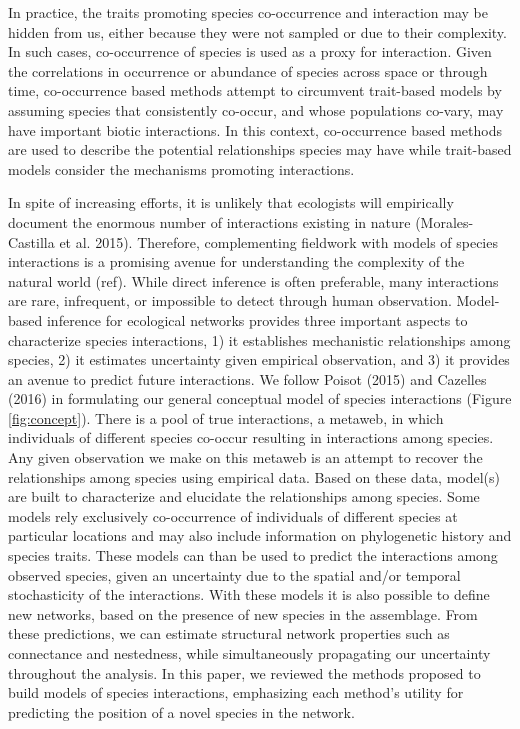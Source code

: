 In practice, the traits promoting species co-occurrence and interaction may be
hidden from us, either because they were not sampled or due to their complexity.
In such cases, co-occurrence of species is used as a proxy for interaction.
Given the correlations in occurrence or abundance of species across space or
through time, co-occurrence based methods attempt to circumvent trait-based
models by assuming species that consistently co-occur, and whose populations
co-vary, may have important biotic interactions. In this context, co-occurrence
based methods are used to describe the potential relationships species may have
while trait-based models consider the mechanisms promoting interactions.

In spite of increasing efforts, it is unlikely that ecologists will empirically
document the enormous number of interactions existing in nature
(Morales-Castilla et al. 2015). Therefore, complementing fieldwork with models
of species interactions is a promising avenue for understanding the complexity
of the natural world (ref). While direct inference is often preferable, many
interactions are rare, infrequent, or impossible to detect through human
observation. Model-based inference for ecological networks provides three
important aspects to characterize species interactions, 1) it establishes
mechanistic relationships among species, 2) it estimates uncertainty given
empirical observation, and 3) it provides an avenue to predict future
interactions. We follow Poisot (2015) and Cazelles (2016) in formulating our
general conceptual model of species interactions (Figure \ref{fig:concept}).
There is a pool of true interactions, a metaweb, in which individuals of
different species co-occur resulting in interactions among species. Any given
observation we make on this metaweb is an attempt to recover the relationships
among species using empirical data. Based on these data, model(s) are built to
characterize and elucidate the relationships among species. Some models rely
exclusively co-occurrence of individuals of different species at particular
locations and may also include information on phylogenetic history and species
traits. These models can than be used to predict the interactions among observed
species, given an uncertainty due to the spatial and/or temporal stochasticity
of the interactions. With these models it is also possible to define new
networks, based on the presence of new species in the assemblage. From these
predictions, we can estimate structural network properties such as connectance
and nestedness, while simultaneously propagating our uncertainty throughout the
analysis. In this paper, we reviewed the methods proposed to build models of
species interactions, emphasizing each method's utility for predicting the
position of a novel species in the network.

